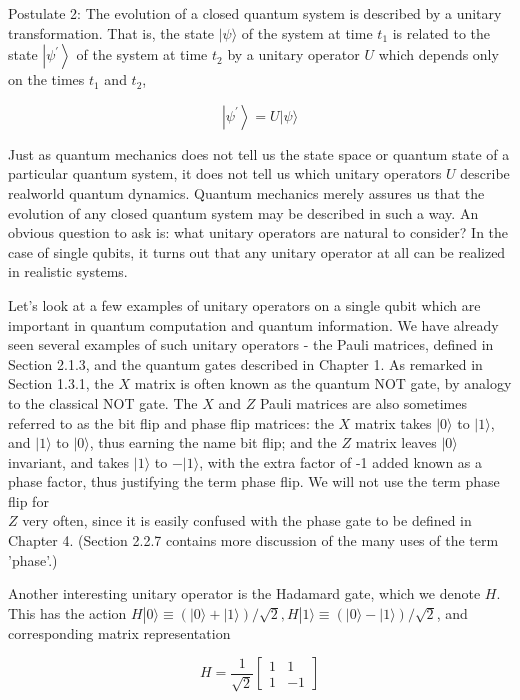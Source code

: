 \documentclass[10pt]{article}
\begin{document}
Postulate 2: The evolution of a closed quantum system is described by a unitary transformation. That is, the state $|\psi\rangle$ of the system at time $t_{1}$ is related to the state $\left|\psi^{\prime}\right\rangle$ of the system at time $t_{2}$ by a unitary operator $U$ which depends only on the times $t_{1}$ and $t_{2}$,


\begin{equation*}
\left|\psi^{\prime}\right\rangle=U|\psi\rangle \tag{2.84}
\end{equation*}


Just as quantum mechanics does not tell us the state space or quantum state of a particular quantum system, it does not tell us which unitary operators $U$ describe realworld quantum dynamics. Quantum mechanics merely assures us that the evolution of any closed quantum system may be described in such a way. An obvious question to ask is: what unitary operators are natural to consider? In the case of single qubits, it turns out that any unitary operator at all can be realized in realistic systems.

Let's look at a few examples of unitary operators on a single qubit which are important in quantum computation and quantum information. We have already seen several examples of such unitary operators - the Pauli matrices, defined in Section 2.1.3, and the quantum gates described in Chapter 1. As remarked in Section 1.3.1, the $X$ matrix is often known as the quantum NOT gate, by analogy to the classical NOT gate. The $X$ and $Z$ Pauli matrices are also sometimes referred to as the bit flip and phase flip matrices: the $X$ matrix takes $|0\rangle$ to $|1\rangle$, and $|1\rangle$ to $|0\rangle$, thus earning the name bit flip; and the $Z$ matrix leaves $|0\rangle$ invariant, and takes $|1\rangle$ to $-|1\rangle$, with the extra factor of -1 added known as a phase factor, thus justifying the term phase flip. We will not use the term phase flip for\\
$Z$ very often, since it is easily confused with the phase gate to be defined in Chapter 4. (Section 2.2.7 contains more discussion of the many uses of the term 'phase'.)

Another interesting unitary operator is the Hadamard gate, which we denote $H$. This has the action $H|0\rangle \equiv(|0\rangle+|1\rangle) / \sqrt{2}, H|1\rangle \equiv(|0\rangle-|1\rangle) / \sqrt{2}$, and corresponding matrix representation

\[
H=\frac{1}{\sqrt{2}}\left[\begin{array}{cc}
1 & 1  \tag{2.85}\\
1 & -1
\end{array}\right]
\]
\end{document}
